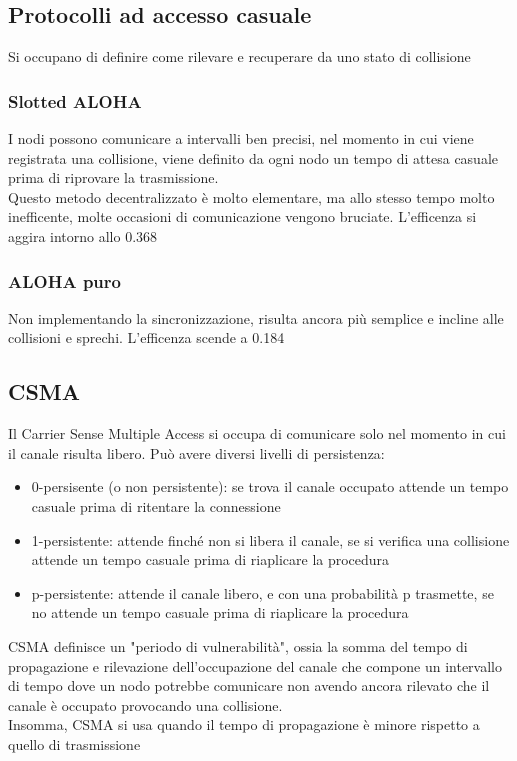 \documentclass[12pt, a4paper]{article}
\begin{document}
\subsection{Protocolli ad accesso casuale}
Si occupano di definire come rilevare e recuperare da uno stato di collisione

\subsubsection{Slotted ALOHA}
I nodi possono comunicare a intervalli ben precisi, nel momento in cui viene registrata una collisione, viene 
definito da ogni nodo un tempo di attesa casuale prima di riprovare la trasmissione. \\
Questo metodo decentralizzato è molto elementare, ma allo stesso tempo molto inefficente, molte occasioni 
di comunicazione vengono bruciate. L'efficenza si aggira intorno allo 0.368

\subsubsection{ALOHA puro}
Non implementando la sincronizzazione, risulta ancora più semplice e incline alle collisioni e sprechi.
L'efficenza scende a 0.184

\subsection{CSMA}
Il Carrier Sense Multiple Access si occupa di comunicare solo nel momento in cui il canale risulta libero.
Può avere diversi livelli di persistenza:
\begin{itemize}
    \item 0-persisente (o non persistente): se trova il canale occupato attende un tempo casuale prima di
    ritentare la connessione
    \item 1-persistente: attende finché non si libera il canale, se si verifica una collisione attende un 
    tempo casuale prima di riaplicare la procedura
    \item p-persistente: attende il canale libero, e con una probabilità p trasmette, se no attende un
    tempo casuale prima di riaplicare la procedura
\end{itemize}

CSMA definisce un "periodo di vulnerabilità", ossia la somma del tempo di propagazione e rilevazione 
dell'occupazione del canale che compone un intervallo di tempo dove un nodo potrebbe comunicare 
non avendo ancora rilevato che il canale è occupato provocando una collisione.\\
Insomma, CSMA si usa quando il tempo di propagazione è minore rispetto a quello di trasmissione
\end{document}
